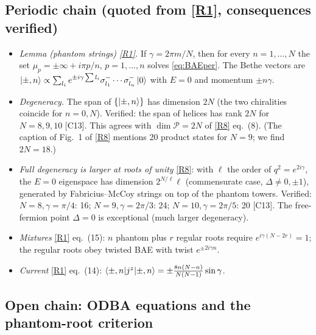 \documentclass[11pt,a4paper]{article}
\theoremstyle{definition}
\newcommand{\ver}[1]{\textsf{[#1]}}   %
\begin{document}
\subsection{Periodic chain (quoted from \ref{R1}, consequences verified)}
\begin{itemize}
\item \emph{Lemma (phantom strings) \ref{R1}.} If $\gamma=2\pi m/N$, then for every $n=1,\dots,N$ the set $\mu_p=\pm\infty+i\pi p/n$, $p=1,\dots,n$ solves \eqref{eq:BAEper}. The Bethe vectors are $\ket{\pm,n}\propto\sum_{l_i}e^{\pm i\gamma\sum l_i}\sigma^-_{l_1}\cdots\sigma^-_{l_n}\ket0$ with $E=0$ and momentum $\pm n\gamma$.
\item \emph{Degeneracy.} The span of $\{\ket{\pm,n}\}$ has dimension $2N$ (the two chiralities coincide for $n=0,N$). Verified: the span of helices has rank $2N$ for $N=8,9,10$ \ver{C13}. This agrees with $\dim\mathcal P=2N$ of \ref{R8} eq.~(8). (The caption of Fig.~1 of \ref{R8} mentions 20 product states for $N=9$; we find $2N=18$.)
\item \emph{Full degeneracy is larger at roots of unity} \ref{R8}: with $\ell$ the order of $q^2=e^{2i\gamma}$, the $E=0$ eigenspace has dimension $2^{N/\ell}\ell$ (commensurate case, $\Delta\neq0,\pm1$), generated by Fabricius--McCoy strings on top of the phantom towers. Verified: $N=8,\gamma=\pi/4$: 16; $N=9,\gamma=2\pi/3$: 24; $N=10,\gamma=2\pi/5$: 20 \ver{C13}. The free-fermion point $\Delta=0$ is exceptional (much larger degeneracy).
\item \emph{Mixtures} \ref{R1} eq.~(15): $n$ phantom plus $r$ regular roots require $e^{i\gamma(N-2r)}=1$; the regular roots obey twisted BAE with twist $e^{\pm2i\gamma n}$.
\item \emph{Current} \ref{R1} eq.~(14): $\braket{\pm,n|j^z|\pm,n}=\pm\frac{8n(N-n)}{N(N-1)}\sin\gamma$.
\end{itemize}

\subsection{Open chain: ODBA equations and the phantom-root criterion}
\end{document}
